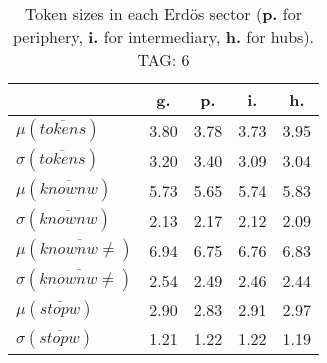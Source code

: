 \begin{table}[h!]
\begin{center}
\begin{tabular}{| l || c | c | c | c |}\hline
 & {\bf g.} & {\bf p.} & {\bf i.} & {\bf h.} \\\hline\hline
$\mu(\overline{tokens})$ & 3.80  & 3.78  & 3.73  & 3.95 \\
$\sigma(\overline{tokens})$ & 3.20  & 3.40  & 3.09  & 3.04 \\\hline
$\mu(\overline{knownw})$ & 5.73  & 5.65  & 5.74  & 5.83 \\
$\sigma(\overline{knownw})$ & 2.13  & 2.17  & 2.12  & 2.09 \\\hline
$\mu(\overline{knownw \neq})$ & 6.94  & 6.75  & 6.76  & 6.83 \\
$\sigma(\overline{knownw \neq})$ & 2.54  & 2.49  & 2.46  & 2.44 \\\hline
$\mu(\overline{stopw})$ & 2.90  & 2.83  & 2.91  & 2.97 \\
$\sigma(\overline{stopw})$ & 1.21  & 1.22  & 1.22  & 1.19 \\\hline
\end{tabular}
\caption{Token sizes in each Erd\"os sector ({{\bf p.}} for periphery, {{\bf i.}} for intermediary, {{\bf h.}} for hubs). TAG: 6}
\end{center}
\end{table}
